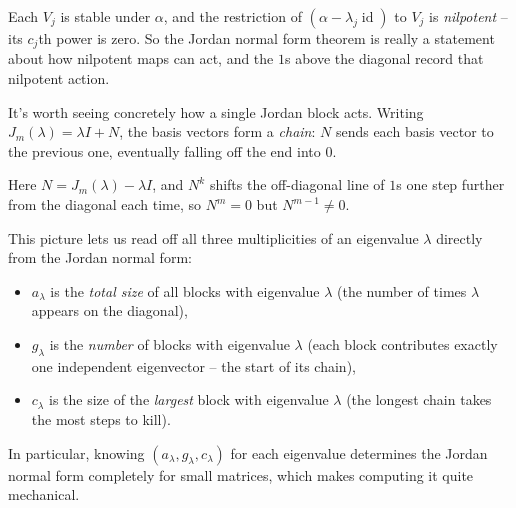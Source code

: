 \documentclass[a4paper]{scrartcl}
\begin{document}
\begin{remark}
    Each $V_j$ is stable under $\alpha$, and the restriction of $(\alpha - \lambda_j \operatorname{id})$ to $V_j$ is \emph{nilpotent} -- its $c_j$th power is zero. So the Jordan normal form theorem is really a statement about how nilpotent maps can act, and the $1$s above the diagonal record that nilpotent action.
\end{remark}

It's worth seeing concretely how a single Jordan block acts. Writing $J_m(\lambda) = \lambda I + N$, the basis vectors form a \emph{chain}: $N$ sends each basis vector to the previous one, eventually falling off the end into $0$.
\begin{center}
\end{center}
Here $N = J_m(\lambda) - \lambda I$, and $N^k$ shifts the off-diagonal line of $1$s one step further from the diagonal each time, so $N^m = 0$ but $N^{m-1} \neq 0$.

This picture lets us read off all three multiplicities of an eigenvalue $\lambda$ directly from the Jordan normal form:
\begin{itemize}
    \item $a_\lambda$ is the \emph{total size} of all blocks with eigenvalue $\lambda$ (the number of times $\lambda$ appears on the diagonal),
    \item $g_\lambda$ is the \emph{number} of blocks with eigenvalue $\lambda$ (each block contributes exactly one independent eigenvector -- the start of its chain),
    \item $c_\lambda$ is the size of the \emph{largest} block with eigenvalue $\lambda$ (the longest chain takes the most steps to kill).
\end{itemize}
In particular, knowing $(a_\lambda, g_\lambda, c_\lambda)$ for each eigenvalue determines the Jordan normal form completely for small matrices, which makes computing it quite mechanical.
\end{document}
